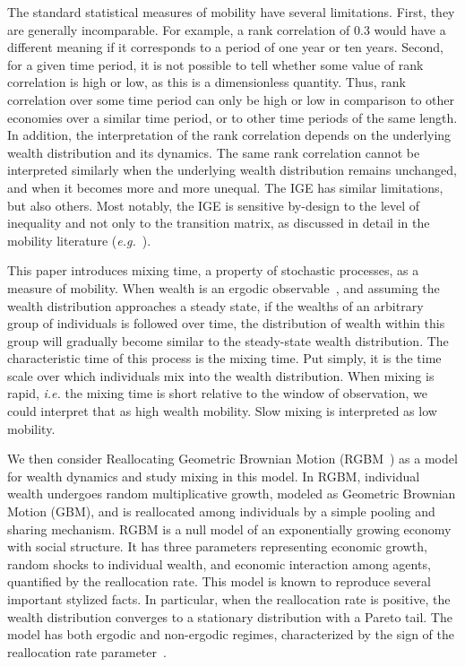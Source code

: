 \documentclass[11pt]{article}
\newcommand{\ie}{{\it i.e.}\xspace}
\newcommand{\eg}{{\it e.g.}\xspace}
\numberwithin{equation}{section}
\begin{document}
The standard statistical measures of mobility have several limitations. First, they are generally incomparable. For example, a rank correlation of 0.3 would have a different meaning if it corresponds to a period of one year or ten years. Second, for a given time period, it is not possible to tell whether some value of rank correlation is high or low, as this is a dimensionless quantity. Thus, rank correlation over some time period can only be high or low in comparison to other economies over a similar time period, or to other time periods of the same length.
In addition, the interpretation of the rank correlation depends on the underlying wealth distribution and its dynamics. The same rank correlation cannot be interpreted similarly when the underlying wealth distribution remains unchanged, and when it becomes more and more unequal.
The IGE has similar limitations, but also others. Most notably, the IGE is sensitive by-design to the level of inequality and not only to the transition matrix, as discussed in detail in the mobility literature (\eg~\citet{chettyETAL2014}).

This paper introduces mixing time, a property of stochastic processes, as a measure of mobility. When wealth is an ergodic observable~\citep{PetersAdamou2018c}, and assuming the wealth distribution approaches a steady state, if the wealths of an arbitrary group of individuals is followed over time, the distribution of wealth within this group will gradually become similar to the steady-state wealth distribution. The characteristic time of this process is the mixing time. Put simply, it is the time scale over which individuals mix into the wealth distribution. When mixing is rapid, \ie the mixing time is short relative to the window of observation, we could interpret that as high wealth mobility. Slow mixing is interpreted as low mobility.

We then consider Reallocating Geometric Brownian Motion (RGBM~\citep{MarsiliMaslovZhang1998,LiuSerota2017,BermanPetersAdamou2019}) as a model for wealth dynamics and study mixing in this model. In RGBM, individual wealth undergoes random multiplicative growth, modeled as Geometric Brownian Motion (GBM), and is reallocated among individuals by a simple pooling and sharing mechanism. RGBM is a null model of an exponentially growing economy with social structure. It has three parameters representing economic growth, random shocks to individual wealth, and economic interaction among agents, quantified by the reallocation rate. This model is known to reproduce several important stylized facts. In particular, when the reallocation rate is positive, the wealth distribution converges to a stationary distribution with a Pareto tail. The model has both ergodic and non-ergodic regimes, characterized by the sign of the reallocation rate parameter~\citep{BermanPetersAdamou2019}.
\end{document}
